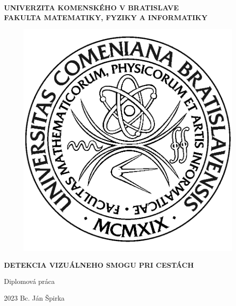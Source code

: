 \documentclass[12pt, a4paper, oneside]{book}
\newcommand\mftitle{Detekcia vizuálneho smogu pri cestách}
\newcommand\mfthesistype{Diplomová práca}
\newcommand\mfauthor{Bc. Ján Špirka}
\newcommand\mfuniversity{UNIVERZITA KOMENSKÉHO V BRATISLAVE}
\newcommand\mffaculty{FAKULTA MATEMATIKY, FYZIKY A INFORMATIKY}
\begin{document}
\frontmatter



\thispagestyle{empty}

\noindent
\begin{minipage}{\textwidth}
\begin{center}
\textbf{\mfuniversity \\
\mffaculty}
\end{center}
\end{minipage}

\vfill
\begin{figure}[!hbt]
	\begin{center}
		\includegraphics{images/logo_fmph}
		\label{img:logo}
	\end{center}
\end{figure}
\begin{center}
	\begin{minipage}{0.8\textwidth}
		\centerline{\textbf{\Large\MakeUppercase{\mftitle}}}
		\smallskip
		\centerline{\mfthesistype}
	\end{minipage}
\end{center}
\vfill
2023 \hfill
\mfauthor
\cleardoublepage
\end{document}
